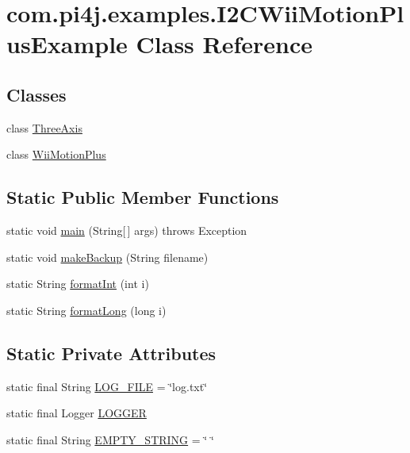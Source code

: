 \hypertarget{classcom_1_1pi4j_1_1examples_1_1I2CWiiMotionPlusExample}{}\section{com.\+pi4j.\+examples.\+I2\+C\+Wii\+Motion\+Plus\+Example Class Reference}
\label{classcom_1_1pi4j_1_1examples_1_1I2CWiiMotionPlusExample}
\subsection*{Classes}
\begin{DoxyCompactItemize}
\item 
class \hyperlink{classcom_1_1pi4j_1_1examples_1_1I2CWiiMotionPlusExample_1_1ThreeAxis}{Three\+Axis}
\item 
class \hyperlink{classcom_1_1pi4j_1_1examples_1_1I2CWiiMotionPlusExample_1_1WiiMotionPlus}{Wii\+Motion\+Plus}
\end{DoxyCompactItemize}
\subsection*{Static Public Member Functions}
\begin{DoxyCompactItemize}
\item 
static void \hyperlink{classcom_1_1pi4j_1_1examples_1_1I2CWiiMotionPlusExample_ab70f795c9aaeef444dbd9536494e97bf}{main} (String\mbox{[}$\,$\mbox{]} args)  throws Exception 
\item 
static void \hyperlink{classcom_1_1pi4j_1_1examples_1_1I2CWiiMotionPlusExample_a69aaf1e91321cf49920fe5c6d62ebd86}{make\+Backup} (String filename)
\item 
static String \hyperlink{classcom_1_1pi4j_1_1examples_1_1I2CWiiMotionPlusExample_ad4e3fbbe78e17178df5c60b748f270ea}{format\+Int} (int i)
\item 
static String \hyperlink{classcom_1_1pi4j_1_1examples_1_1I2CWiiMotionPlusExample_a6bb2cf35eceb2902df176f7cd9447943}{format\+Long} (long i)
\end{DoxyCompactItemize}
\subsection*{Static Private Attributes}
\begin{DoxyCompactItemize}
\item 
static final String \hyperlink{classcom_1_1pi4j_1_1examples_1_1I2CWiiMotionPlusExample_a79cb6b5d2e13a7d078a04935985de532}{L\+O\+G\+\_\+\+F\+I\+L\+E} = \char`\"{}log.\+txt\char`\"{}
\item 
static final Logger \hyperlink{classcom_1_1pi4j_1_1examples_1_1I2CWiiMotionPlusExample_a8cc3c8ff3d397904bd9e6dd8a82644d7}{L\+O\+G\+G\+E\+R}
\item 
static final String \hyperlink{classcom_1_1pi4j_1_1examples_1_1I2CWiiMotionPlusExample_a6ec0a220e417a66f10e90138b00f93ab}{E\+M\+P\+T\+Y\+\_\+\+S\+T\+R\+I\+N\+G} = \char`\"{} \char`\"{}
\end{DoxyCompactItemize}


